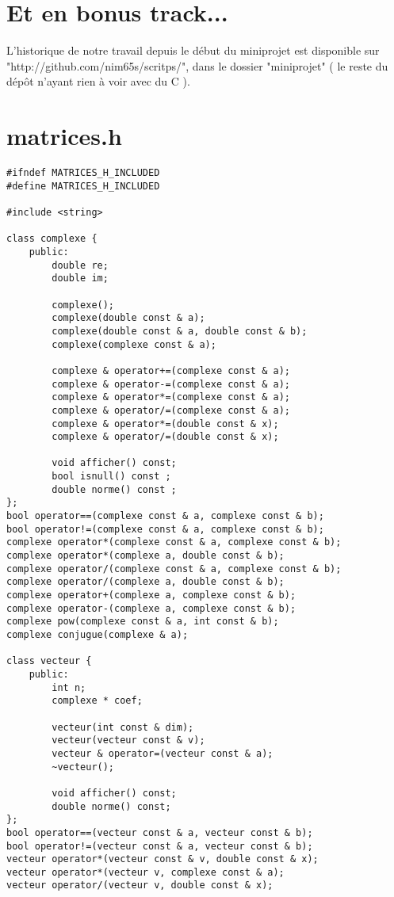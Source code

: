 \documentclass[a4paper]{article}
\begin{document}
\section{Et en bonus track...}

L'historique de notre travail depuis le début du miniprojet est disponible sur "http://github.com/nim65s/scritps/", dans le dossier "miniprojet" ( le reste du dépôt n'ayant rien à voir avec du C ).

\newpage
\appendix

\section{matrices.h}
\begin{verbatim}
#ifndef MATRICES_H_INCLUDED
#define MATRICES_H_INCLUDED

#include <string>

class complexe {
    public:
        double re;
        double im;

        complexe();
        complexe(double const & a);
        complexe(double const & a, double const & b);
        complexe(complexe const & a);

        complexe & operator+=(complexe const & a);
        complexe & operator-=(complexe const & a);
        complexe & operator*=(complexe const & a);
        complexe & operator/=(complexe const & a);
        complexe & operator*=(double const & x);
        complexe & operator/=(double const & x);

        void afficher() const;
        bool isnull() const ;
        double norme() const ;
};
bool operator==(complexe const & a, complexe const & b);
bool operator!=(complexe const & a, complexe const & b);
complexe operator*(complexe const & a, complexe const & b);
complexe operator*(complexe a, double const & b);
complexe operator/(complexe const & a, complexe const & b);
complexe operator/(complexe a, double const & b);
complexe operator+(complexe a, complexe const & b);
complexe operator-(complexe a, complexe const & b);
complexe pow(complexe const & a, int const & b);
complexe conjugue(complexe & a);

class vecteur {
    public:
        int n;
        complexe * coef;

        vecteur(int const & dim);
        vecteur(vecteur const & v);
        vecteur & operator=(vecteur const & a);
        ~vecteur();

        void afficher() const;
        double norme() const;
};
bool operator==(vecteur const & a, vecteur const & b);
bool operator!=(vecteur const & a, vecteur const & b);
vecteur operator*(vecteur const & v, double const & x);
vecteur operator*(vecteur v, complexe const & a);
vecteur operator/(vecteur v, double const & x);


\end{verbatim}
\end{document}
